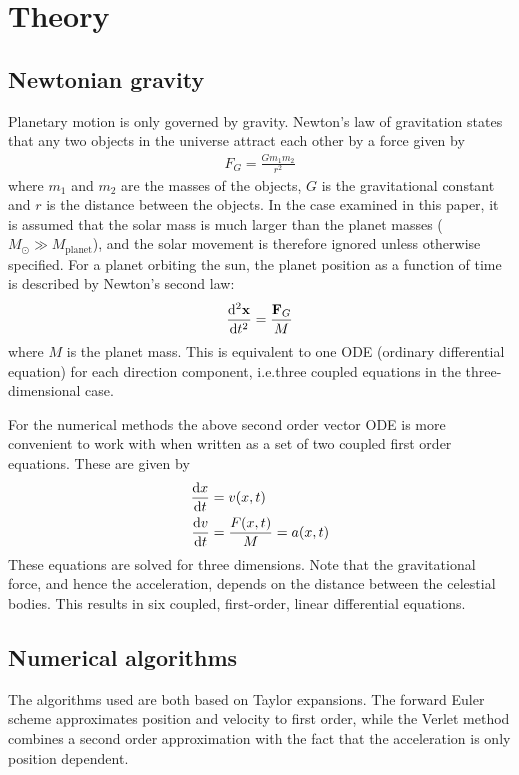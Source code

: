 \documentclass[aps,reprint]{revtex4-1}
\begin{document}
\section{Theory}
\label{sec:theory}
\subsection{Newtonian gravity}
Planetary motion is only governed by gravity. Newton's law of gravitation
states that any two objects in the universe attract each other by a force given
by
\begin{align}
  F_G = \frac{G m_1 m_2}{r^2}
\end{align}
where $m_1$ and $m_2$ are the masses of the objects, $G$ is the
gravitational constant and $r$ is the distance between the objects. In the
case examined in this paper, it is assumed that the solar mass is much larger
than the planet masses ($M_\odot \gg M_\text{planet}$), and the solar
movement is therefore ignored unless otherwise specified.
For a planet orbiting the sun, the
planet position as a function of time is described by Newton's second law:
\begin{align*}
  \dv[2]{\mathbf{x}}{t} = \frac{\mathbf{F}_G}{M}
\end{align*}
where $M$ is the planet mass. This is equivalent to one ODE (ordinary differential
equation) for each direction component, i.e.\@ three coupled equations in the
three-dimensional case.

For the numerical methods the above second order vector ODE is more convenient to
work with when written as a set of two coupled first order equations. These
are given by
\begin{align}
  \begin{split}
  \label{eq:coupledequations}
  \dv{x}{t} &= v(x,t) \\
  \dv{v}{t} &= \frac{F(x,t)}{M} = a(x,t)
  \end{split}
\end{align}
These equations are solved for three dimensions. Note that the gravitational force,
and hence the acceleration, depends on the distance between the celestial bodies.
This results in six coupled, first-order, linear differential equations.

\subsection{Numerical algorithms}
\label{sec:numalgos}
The algorithms used are both based on Taylor expansions. The forward Euler
scheme approximates position and velocity to first order, while the Verlet
method combines a second order approximation with the fact that the acceleration
is only position dependent.
\end{document}
